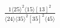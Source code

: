 \documentclass[varwidth, border=5pt]{standalone}
\begin{document}
\begin{my}
$\begin{gathered}
\scriptscriptstyle\frac{1⟨25⟩^2⟨15⟩[13]^2}{⟨24⟩⟨35⟩^2[35]^2⟨45⟩}
\end{gathered}$
\end{my}
\end{document}
